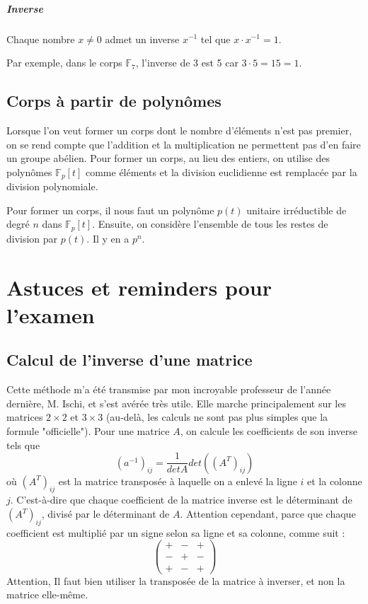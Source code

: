\documentclass[10pt,a4paper]{book}
\newcommand{\F}{\mathbb{F}}
\begin{document}
\paragraph{Inverse}
Chaque nombre $x\neq 0$ admet un inverse $x^{-1}$ tel que $x\cdot x^{-1}=1$.\par
Par exemple, dans le corps $\F_7$, l'inverse de 3 est 5 car $3\cdot 5=15=1$.

\section{Corps à partir de polynômes}
Lorsque l'on veut former un corps dont le nombre d'éléments n'est pas premier, on se rend compte que l'addition et la multiplication ne permettent pas d'en faire un groupe abélien. Pour former un corps, au lieu des entiers, on utilise des polynômes $\F_p[t]$ comme éléments et la division euclidienne est remplacée par la division polynomiale.\par 
Pour former un corps, il nous faut un polynôme $p(t)$ unitaire irréductible de degré $n$ dans $\F_p[t]$. Ensuite, on considère l'ensemble de tous les restes de division par $p(t)$. Il y en a $p^n$.

\chapter{Astuces et reminders pour l'examen}
\section{Calcul de l'inverse d'une matrice}
Cette méthode m'a été transmise par mon incroyable professeur de l'année dernière, M. Ischi, et s'est avérée très utile. Elle marche principalement sur les matrices $2\times 2$ et $3\times 3$ (au-delà, les calculs ne sont pas plus simples que la formule "officielle"). Pour une matrice $A$, on calcule les coefficients de son inverse tels que 
\[(a^{-1})_{ij} = \dfrac{1}{detA} det((A^T)_{ij})\]
où $(A^T)_{ij}$ est la matrice transposée à laquelle on a enlevé la ligne $i$ et la colonne $j$. C'est-à-dire que chaque coefficient de la matrice inverse est le déterminant de $(A^T)_{ij}$, divisé par le déterminant de $A$. Attention cependant, parce que chaque coefficient est multiplié par un signe selon sa ligne et sa colonne, comme suit :
\[\begin{pmatrix}
 + & - & +\\
 - & + & -\\
 + & - & +
\end{pmatrix}\]
Attention, Il faut bien utiliser la transposée de la matrice à inverser, et non la matrice elle-même.
\end{document}
